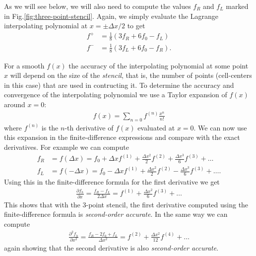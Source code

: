 \documentclass[12pt]{article}
\theoremstyle{definition}
\theoremstyle{definition}
\theoremstyle{definition}
\begin{document}
As we will see below, we will also need to compute the values $f_R$
and $f_L$ marked in
Fig.\thinspace\ref{fig:three-point-stencil}. Again, we simply
evaluate the Lagrange interpolating polynomial at $x = \pm \Delta x/2$
to get
\begin{subequations}
\begin{align}
  f^+ &= \frac{1}{8} ( 3 f_{R} + 6 f_0 - f_L ) \\
  f^- &= \frac{1}{8} ( 3 f_{L} + 6 f_0 - f_R ).
\end{align}
\end{subequations}

For a smooth $f(x)$ the accuracy of the interpolating polynomial at
some point $x$ will depend on the size of the \emph{stencil}, that is,
the number of points (cell-centers in this case) that are used in
contructing it. To determine the accuracy and convergence of the
interpolating polynomial we use a Taylor expansion of $f(x)$ around
$x = 0$:
\begin{align}
  f(x) = \sum_{n=0} f^{(n)} \frac{x^n}{n!} \label{eq:taylor-f}
\end{align}
where $f^{(n)}$ is the $n$-th derivative of $f(x)$ evaluated at
$x=0$. We can now use this expansion in the finite-difference
expressions and compare with the exact derivatives. For example we can
compute
\begin{align}
  f_R 
  &= f(\Delta x) 
  = f_0 + \Delta x f^{(1)} + \frac{\Delta x^2}{2} f^{(2)}  
  + \frac{\Delta x^3}{6} f^{(3)}  + \ldots \\
  f_L
  &= f(-\Delta x) 
  = f_0 - \Delta x f^{(1)} + \frac{\Delta x^2}{2} f^{(2)}  
  - \frac{\Delta x^3}{6} f^{(3)}  + \ldots.
\end{align}
Using this in the finite-difference formula for the first derivative
we get
\begin{align}
  \frac{\partial f_h}{\partial x}
  =
  \frac{f_R - f_L}{2 \Delta x}
  =
  f^{(1)}
  +
  \frac{\Delta x^2}{6} f^{(3)} + \ldots
\end{align}
This shows that with the $3$-point stencil, the first derivative
computed using the finite-difference formula is \emph{second-order
  accurate}. In the same way we can compute
\begin{align}
  \frac{\partial^2 f_h}{\partial x^2}
  =
  \frac{f_R - 2 f_0 + f_L}{\Delta x^2}
  =
  f^{(2)}
  +
  \frac{\Delta x^2}{12} f^{(4)} + \ldots
\end{align}
again showing that the second derivative is also \emph{second-order
  accurate}.
\end{document}
